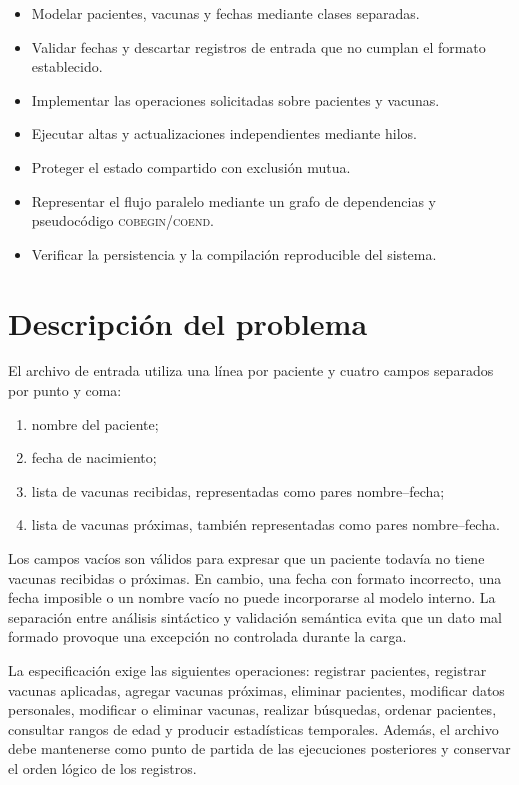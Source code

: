 \documentclass[12pt,letterpaper]{article}
\begin{document}
\begin{itemize}[leftmargin=1.2cm]
    \item Modelar pacientes, vacunas y fechas mediante clases separadas.
    \item Validar fechas y descartar registros de entrada que no cumplan el
    formato establecido.
    \item Implementar las operaciones solicitadas sobre pacientes y vacunas.
    \item Ejecutar altas y actualizaciones independientes mediante hilos.
    \item Proteger el estado compartido con exclusión mutua.
    \item Representar el flujo paralelo mediante un grafo de dependencias y
    pseudocódigo \textsc{cobegin}/\textsc{coend}.
    \item Verificar la persistencia y la compilación reproducible del sistema.
\end{itemize}

\section{Descripción del problema}

El archivo de entrada utiliza una línea por paciente y cuatro campos separados
por punto y coma:

\begin{enumerate}[leftmargin=1.2cm]
    \item nombre del paciente;
    \item fecha de nacimiento;
    \item lista de vacunas recibidas, representadas como pares nombre--fecha;
    \item lista de vacunas próximas, también representadas como pares
    nombre--fecha.
\end{enumerate}

Los campos vacíos son válidos para expresar que un paciente todavía no tiene
vacunas recibidas o próximas. En cambio, una fecha con formato incorrecto, una
fecha imposible o un nombre vacío no puede incorporarse al modelo interno. La
separación entre análisis sintáctico y validación semántica evita que un dato
mal formado provoque una excepción no controlada durante la carga.

La especificación exige las siguientes operaciones: registrar pacientes,
registrar vacunas aplicadas, agregar vacunas próximas, eliminar pacientes,
modificar datos personales, modificar o eliminar vacunas, realizar búsquedas,
ordenar pacientes, consultar rangos de edad y producir estadísticas temporales.
Además, el archivo debe mantenerse como punto de partida de las ejecuciones
posteriores y conservar el orden lógico de los registros.
\end{document}
